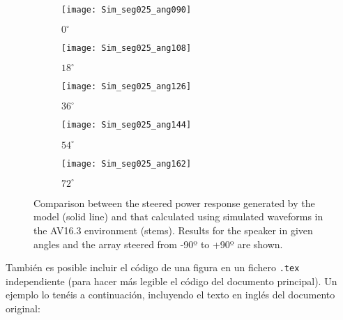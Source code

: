 \begin{figure}
  \centering
  \begin{subfigure}[b]{0.3\textwidth}
    \texttt{[image: Sim\_seg025\_ang090]}
    \caption{$0^{\circ}$}
    \label{fig:Sim_ang090}
  \end{subfigure}

  \begin{subfigure}[b]{0.3\textwidth}
    \texttt{[image: Sim\_seg025\_ang108]}
    \caption{$18^{\circ}$}
    \label{fig:Sim_ang108}
  \end{subfigure}
  \begin{subfigure}[b]{0.3\textwidth}
    \texttt{[image: Sim\_seg025\_ang126]}
    \caption{$36^{\circ}$}
    \label{fig:Sim_ang126}
  \end{subfigure}
  \begin{subfigure}[b]{0.3\textwidth}
    \texttt{[image: Sim\_seg025\_ang144]}
    \caption{$54^{\circ}$}
    \label{fig:Sim_ang144}
  \end{subfigure}

  \begin{subfigure}[b]{0.3\textwidth}
    \texttt{[image: Sim\_seg025\_ang162]}
    \caption{$72^{\circ}$}
    \label{fig:Sim_ang162}
  \end{subfigure}

  \caption{Comparison between the steered power response generated by the model (solid line) and that calculated using simulated waveforms in the AV16.3 environment (stems). Results for the speaker in given angles and the array steered from -90º to +90º are shown.}
  \label{fig:Sim_angles}
\end{figure}

También es posible incluir el código de una figura en un fichero \texttt{.tex} independiente (para hacer más legible el código del documento principal). Un ejemplo lo tenéis a continuación, incluyendo el texto en inglés del documento original:

